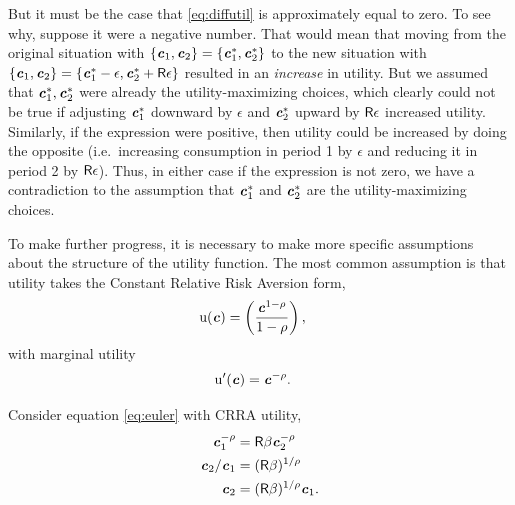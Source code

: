 \documentclass{scrartcl}
\begin{document}
  But it must be the case that \eqref{eq:diffutil} is approximately equal to zero.  To see why, suppose it were a negative number.  That would mean that moving from the original situation with $\{\boldsymbol{\mathit{c}}_{1},\boldsymbol{\mathit{c}}_{2}\} = \{\boldsymbol{\mathit{c}}_{1}^{*},\boldsymbol{\mathit{c}}_{2}^{*}\}$ to the new situation with $\{\boldsymbol{\mathit{c}}_{1},\boldsymbol{\mathit{c}}_{2}\} = \{\boldsymbol{\mathit{c}}_{1}^{*}-\epsilon,\boldsymbol{\mathit{c}}_{2}^{*}+\mathsf{R}\epsilon\}$ resulted in an \textit{increase} in utility.  But we assumed that $\boldsymbol{\mathit{c}}_{1}^{*},\boldsymbol{\mathit{c}}_{2}^{*}$ were already the utility-maximizing choices, which clearly could not be true if adjusting $\boldsymbol{\mathit{c}}_{1}^{*}$ downward by $\epsilon$ and $\boldsymbol{\mathit{c}}^{*}_{2}$ upward by $\mathsf{R} \epsilon$ increased utility.  Similarly, if the expression were positive, then utility could be increased by doing the opposite (i.e.\ increasing consumption in period 1 by $\epsilon$ and reducing it in period 2 by $\mathsf{R}\epsilon$).  Thus, in either case if the expression is not zero, we have a contradiction to the assumption that $\boldsymbol{\mathit{c}}_{1}^{*}$ and $\boldsymbol{\mathit{c}}_{2}^{*}$ are the utility-maximizing choices.

  To make further progress, it is necessary to make more specific assumptions about the structure of the utility function.  The most common assumption is that utility takes the Constant Relative Risk Aversion form,
  \begin{equation}\begin{gathered}\begin{aligned} \mathrm{u}(\boldsymbol{\mathit{c}}) & = \left(\frac{\boldsymbol{\mathit{c}}^{1-\rho}}{1-\rho}\right) \label{eq:crrautil},
      \end{aligned}\end{gathered}\end{equation} with marginal utility
  \begin{equation}\begin{gathered}\begin{aligned} \mathrm{u}^{\prime}(\boldsymbol{\mathit{c}}) & = \boldsymbol{\mathit{c}}^{-\rho} \label{eq:crramargutil}.
      \end{aligned}\end{gathered}\end{equation}

  Consider equation \eqref{eq:euler} with CRRA utility,
  \begin{equation}\begin{gathered}\begin{aligned} \boldsymbol{\mathit{c}}_{1}^{-\rho} & = \mathsf{R}\beta \boldsymbol{\mathit{c}}_{2}^{-\rho} \\ \boldsymbol{\mathit{c}}_{2}/\boldsymbol{\mathit{c}}_{1} & = (\mathsf{R}\beta)^{1/\rho} \\ \boldsymbol{\mathit{c}}_{2} & = (\mathsf{R}\beta)^{1/\rho}\boldsymbol{\mathit{c}}_{1} \label{eq:c1euler}.
      \end{aligned}\end{gathered}\end{equation}
\end{document}
